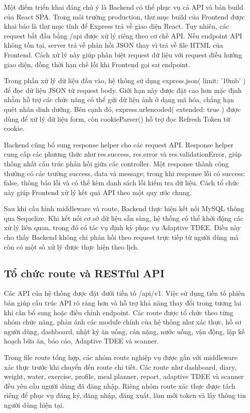\documentclass[12pt, a4paper]{report}
\begin{document}
Một điểm triển khai đáng chú ý là Backend có thể phục vụ cả API và bản build của React SPA. Trong môi trường production, thư mục build của Frontend được khai báo là thư mục tĩnh để Express trả về giao diện React. Tuy nhiên, các request bắt đầu bằng /api được xử lý riêng theo cơ chế API. Nếu endpoint API không tồn tại, server trả về phản hồi JSON thay vì trả về file HTML của Frontend. Cách xử lý này giúp phân biệt request dữ liệu với request điều hướng giao diện, đồng thời hạn chế lỗi khi Frontend gọi sai endpoint.

Trong phần xử lý dữ liệu đầu vào, hệ thống sử dụng express.json({ limit: '10mb' }) để đọc dữ liệu JSON từ request body. Giới hạn này được đặt cao hơn mặc định nhằm hỗ trợ các chức năng có thể gửi dữ liệu ảnh ở dạng mã hóa, chẳng hạn quét nhãn dinh dưỡng. Bên cạnh đó, express.urlencoded({ extended: true }) được dùng để xử lý dữ liệu form, còn cookieParser() hỗ trợ đọc Refresh Token từ cookie.

Backend cũng bổ sung response helper cho các request API. Response helper cung cấp các phương thức như res.success, res.error và res.validationError, giúp thống nhất cấu trúc phản hồi giữa các controller. Một response thành công thường có các trường success, data và message; trong khi response lỗi có success: false, thông báo lỗi và có thể kèm danh sách lỗi kiểm tra dữ liệu. Cách tổ chức này giúp Frontend xử lý kết quả API theo một quy ước chung.

Sau khi cấu hình middleware và route, Backend thực hiện kết nối MySQL thông qua Sequelize. Khi kết nối cơ sở dữ liệu sẵn sàng, hệ thống có thể khởi động các xử lý liên quan, trong đó có tác vụ định kỳ phục vụ Adaptive TDEE. Điều này cho thấy Backend không chỉ phản hồi theo request trực tiếp từ người dùng mà còn có một số xử lý được thực hiện theo lịch.

\subsection{Tổ chức route và RESTful API}Các API của hệ thống được đặt dưới tiền tố /api/v1. Việc sử dụng tiền tố phiên bản giúp cấu trúc API rõ ràng hơn và hỗ trợ khả năng thay đổi trong tương lai khi cần bổ sung hoặc điều chỉnh endpoint. Các route được tổ chức theo từng nhóm chức năng, phản ánh các module chính của hệ thống như xác thực, hồ sơ người dùng, dashboard, nhật ký ăn uống, cân nặng, nước uống, vận động, lập kế hoạch bữa ăn, báo cáo, Adaptive TDEE và scanner.

Trong file route tổng hợp, các nhóm route nghiệp vụ được gắn với middleware xác thực trước khi chuyển đến route chi tiết. Các route như dashboard, diary, weight, water, exercise, profile, meal planner, report, adaptive TDEE và scanner đều yêu cầu người dùng đã đăng nhập. Riêng nhóm route xác thực được tách riêng để phục vụ đăng ký, đăng nhập, đăng xuất, làm mới token và lấy thông tin người dùng hiện tại.
\end{document}
